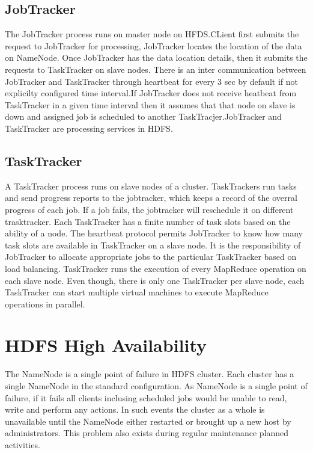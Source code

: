 \subsection{JobTracker}

The JobTracker process runs on master node on HFDS.CLient 
first submits the request to JobTracker for processing,
JobTracker locates the location of the data on NameNode. 
Once JobTracker has the data location details, then it submits 
the requests to TaskTracker on slave nodes. There is an inter communication 
between JobTracker and TaskTracker through heartbeat for every 3 sec 
by default if not explicilty configured time interval.If JobTracker 
does not receive heatbeat from TaskTracker in a given time interval then 
it assumes that that node on slave is down and assigned
job is scheduled to another TaskTracjer.JobTracker and 
TaskTracker are processing services in HDFS.

\subsection{TaskTracker}

A TaskTracker process runs on slave nodes of a cluster. 
TaskTrackers run tasks and send progress reports to the jobtracker,
which keeps a record of the overral progress of each job.
If a job fails, the jobtracker will reschedule it on different trasktracker.
Each TaskTracker has a finite number of task slots based on the 
ability of a node. The heartbeat protocol permits JobTracker to know 
how many task slots are available in TaskTracker on a slave node.
It is the responsibility of JobTracker to allocate appropriate jobs to the 
particular TaskTracker based on load balancing. 
TaskTracker runs the execution of every MapReduce 
operation on each slave node. Even though, there is only one 
TaskTracker per slave node, each TaskTracker can start 
multiple virtual machines to execute MapReduce operations in parallel. 


\section{HDFS High Availability} 

The NameNode is a single point of failure in HDFS cluster.
Each cluster has a single NameNode in the standard configuration.
As NameNode is a single point of failure, if it fails all clients
inclusing scheduled jobs would be unable to read, write and perform
any actions. In such events the cluster as a whole is unavailable
until the NameNode either restarted or brought up a new host by
administrators. This problem also exists during regular maintenance 
planned activities.

